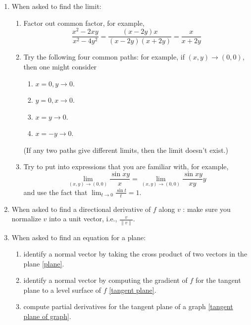\documentclass[openany]{book}
\newcommand{\R}{\mathbb{R}}
\begin{document}
\begin{enumerate}
    \item When asked to find the limit: 
    \begin{enumerate}
        \item[Step 1:] Factor out common factor, for example,
        \begin{equation*}
            \frac{x^2-2xy}{x^2-4y^2}=\frac{(x-2y)x}{(x-2y)(x+2y)}=\frac{x}{x+2y}
        \end{equation*}
        \item[Step 2:] Try the following four common paths: for example, if $(x,y)\to (0,0)$, then one might consider
        \begin{enumerate}
            \item $x=0, y\to 0$.
            \item $y=0, x\to 0$.
            \item $x=y\to 0$.
            \item $x=-y\to 0$.
        \end{enumerate}
        (If any two paths give different limits, then the limit doesn't exist.)
        \item[Step 3:] Try to put into expressions that you are familiar with, for example, 
        \begin{equation*}
            \lim_{(x,y)\to(0,0)}\frac{\sin xy}{x}=\lim_{(x,y)\to(0,0)}\frac{\sin xy}{xy}y
        \end{equation*}
        and use the fact that $\lim_{t\to 0}\frac{\sin t}{t}=1$.
    \end{enumerate}
    \item When asked to find a directional derivative of $f$ along $v$ : make sure you normalize $v$ into a unit vector, i.e., $\frac{v}{\|v\|}$.
    \item When asked to find an equation for a plane:
    \begin{enumerate}
        \item identify a normal vector by taking the cross product of two vectors in the plane \ref{plane}.
        \item identify a normal vector by computing the gradient of $f$ for the tangent plane to a level surface of $f$ \ref{tangent plane}.
        \item compute partial derivatives for the tangent plane of a graph \ref{tangent plane of graph}. 
    \end{enumerate}
\end{enumerate}
\end{document}

